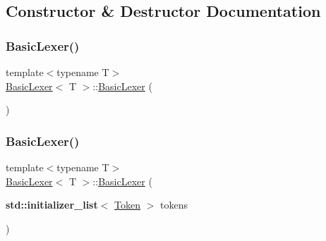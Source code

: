 \subsection{Constructor \& Destructor Documentation}
\mbox{\label{class_basic_lexer_abc267aed0ef7227486b932f13b2917f0}} 
\subsubsection{\texorpdfstring{Basic\+Lexer()}{BasicLexer()}\hspace{0.1cm}{\footnotesize\ttfamily [1/6]}}
{\footnotesize\ttfamily template$<$typename T$>$ \\
\hyperlink{class_basic_lexer}{Basic\+Lexer}$<$ T $>$\+::\hyperlink{class_basic_lexer}{Basic\+Lexer} (\begin{DoxyParamCaption}{ }\end{DoxyParamCaption})\hspace{0.3cm}{\ttfamily [inline]}}

\mbox{\label{class_basic_lexer_a58d2038fb47025d4e32c20750e713b43}} 
\subsubsection{\texorpdfstring{Basic\+Lexer()}{BasicLexer()}\hspace{0.1cm}{\footnotesize\ttfamily [2/6]}}
{\footnotesize\ttfamily template$<$typename T$>$ \\
\hyperlink{class_basic_lexer}{Basic\+Lexer}$<$ T $>$\+::\hyperlink{class_basic_lexer}{Basic\+Lexer} (\begin{DoxyParamCaption}\item[{\textbf{ std\+::initializer\+\_\+list}$<$ \hyperlink{class_token}{Token} $>$}]{tokens }\end{DoxyParamCaption})\hspace{0.3cm}{\ttfamily [inline]}}

\mbox{\label{class_basic_lexer_a1fd5d2795464497ffbe2bf61c892d619}} 

